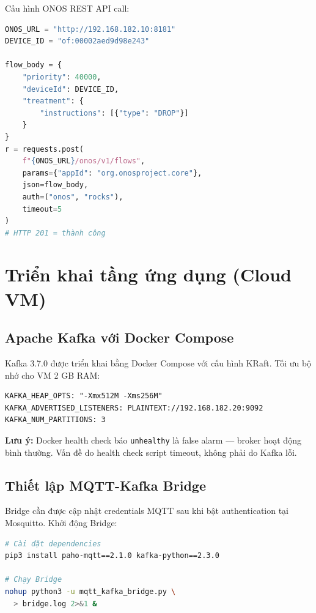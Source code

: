 Cấu hình ONOS REST API call:
\begin{lstlisting}[language=python, caption={Gọi ONOS REST API để push flow rule DROP}]
ONOS_URL = "http://192.168.182.10:8181"
DEVICE_ID = "of:00002aed9d98e243"

flow_body = {
    "priority": 40000,
    "deviceId": DEVICE_ID,
    "treatment": {
        "instructions": [{"type": "DROP"}]
    }
}
r = requests.post(
    f"{ONOS_URL}/onos/v1/flows",
    params={"appId": "org.onosproject.core"},
    json=flow_body,
    auth=("onos", "rocks"),
    timeout=5
)
# HTTP 201 = thành công
\end{lstlisting}

\section{Triển khai tầng ứng dụng (Cloud VM)}

\subsection{Apache Kafka với Docker Compose}

Kafka 3.7.0 được triển khai bằng Docker Compose với cấu hình KRaft. Tối ưu bộ nhớ cho VM 2 GB RAM:

\begin{lstlisting}[caption={Cấu hình bộ nhớ Kafka cho VM giới hạn RAM}]
KAFKA_HEAP_OPTS: "-Xmx512M -Xms256M"
KAFKA_ADVERTISED_LISTENERS: PLAINTEXT://192.168.182.20:9092
KAFKA_NUM_PARTITIONS: 3
\end{lstlisting}

\textbf{Lưu ý:} Docker health check báo \texttt{unhealthy} là false alarm — broker hoạt động bình thường. Vấn đề do health check script timeout, không phải do Kafka lỗi.

\subsection{Thiết lập MQTT-Kafka Bridge}

Bridge cần được cập nhật credentials MQTT sau khi bật authentication tại Mosquitto. Khởi động Bridge:

\begin{lstlisting}[language=bash, caption={Khởi động MQTT-Kafka Bridge}]
# Cài đặt dependencies
pip3 install paho-mqtt==2.1.0 kafka-python==2.3.0

# Chạy Bridge
nohup python3 -u mqtt_kafka_bridge.py \
  > bridge.log 2>&1 &
\end{lstlisting}

